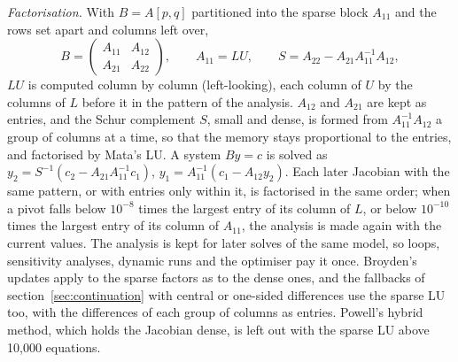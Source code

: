 \textit{Factorisation.} With $B = A[p, q]$ partitioned into the sparse block
$A_{11}$ and the rows set apart and columns left over,
\begin{equation*}
B = \begin{pmatrix} A_{11} & A_{12}\\ A_{21} & A_{22} \end{pmatrix}, \qquad
A_{11} = L U, \qquad S = A_{22} - A_{21} A_{11}^{-1} A_{12},
\end{equation*}
$L U$ is computed column by column (left-looking), each column of $U$ by
the columns of $L$ before it in the pattern of the analysis. $A_{12}$ and
$A_{21}$ are kept as entries, and the Schur complement $S$, small and dense,
is formed from $A_{11}^{-1} A_{12}$ a group of columns at a time, so that the
memory stays proportional to the entries, and factorised by Mata's LU. A
system $B y = c$ is solved as $y_2 = S^{-1}(c_2 - A_{21} A_{11}^{-1} c_1)$,
$y_1 = A_{11}^{-1}(c_1 - A_{12} y_2)$. Each later Jacobian with the same
pattern, or with entries only within it, is factorised in the same order;
when a pivot falls below $10^{-8}$ times the largest entry of its column of
$L$, or below $10^{-10}$ times the largest entry of its column of $A_{11}$,
the analysis is made again with the current values. The analysis is kept for later solves of the same model, so
loops, sensitivity analyses, dynamic runs and the optimiser pay it once.
Broyden's updates apply to the sparse factors as to the dense ones, and the
fallbacks of section~\ref{sec:continuation} with central or one-sided
differences use the sparse LU too, with the differences of each group of
columns as entries. Powell's hybrid method, which holds the Jacobian dense,
is left out with the sparse LU above 10,000 equations.

